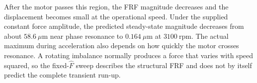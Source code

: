 After the motor passes this region, the FRF magnitude decreases and the displacement becomes small at the operational speed. Under the supplied constant force amplitude, the predicted steady-state magnitude decreases from about $58.6\ \mu\mathrm{m}$ near phase resonance to $0.164\ \mu\mathrm{m}$ at $3100\ \mathrm{rpm}$. The actual maximum during acceleration also depends on how quickly the motor crosses resonance. A rotating imbalance normally produces a force that varies with speed squared, so the fixed-$\hat F$ sweep describes the structural FRF and does not by itself predict the complete transient run-up.

\clearpage
{}



\endgroup
